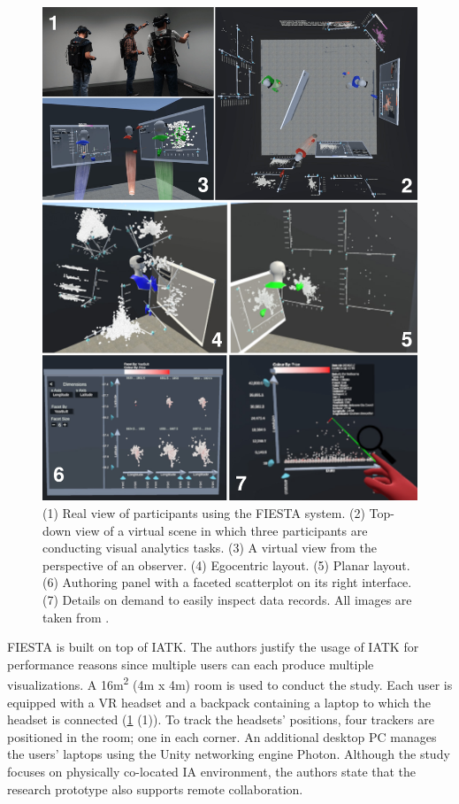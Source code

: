 \documentclass{vgtc}                          %
\begin{document}
\begin{figure}[tb]
	\centering
	\includegraphics[width=\columnwidth]{fiesta}
	\caption{(1) Real view of participants using the FIESTA system. (2)
		Top-down view of a virtual scene in which three participants are
		conducting visual analytics tasks. (3) A virtual view from the perspective of an
		observer. (4) Egocentric layout. (5) Planar layout. (6) Authoring panel
		with a faceted scatterplot on its right interface. (7) Details on
		demand to easily inspect data records. All images are taken from
		\cite{fiesta_prototype}.}
	\label{fig:fiesta}
\end{figure}

\noindent FIESTA is built on top of IATK. The authors justify the usage of IATK
for performance reasons since multiple users can each produce multiple
visualizations. A 16m\textsuperscript{2} (4m x 4m) room is used to conduct the
study. Each user is equipped with a VR headset and a backpack containing a
laptop to which the headset is connected (\ref{fig:fiesta} (1)). To track the
headsets' positions, four trackers are positioned in the room; one in each
corner. An additional desktop PC manages the users' laptops using the Unity
networking engine Photon. Although the study focuses on physically co-located
IA environment, the authors state that the research prototype also supports
remote collaboration.
\end{document}
